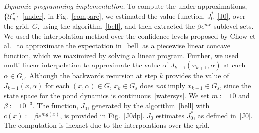 \documentclass[letterpaper, 10 pt, conference]{ieeeconf}  %
\begin{document}
\textit{Dynamic programming implementation.}
To compute the under-approximations, $\{\mathcal{U}_y^r\}$~\eqref{under}, in Fig.~\ref{compare}, we estimated the value function, $J_0^*$~\eqref{J0}, over the grid, $G$,
using the algorithm~\eqref{bell}, and then extracted the $\beta e^{m r}$-sublevel sets.
We used the interpolation method over the confidence levels proposed by Chow et al.~\cite{chow2015risk} 
to approximate the expectation in~\eqref{bell}
as a piecewise linear concave function, which we maximized by solving a linear program.\footnotemark
{}
Further, we used multi-linear interpolation to approximate the value of $J_{k+1}(x_{k+1}, \alpha)$ at each $\alpha \in G_c$.
Although the backwards recursion at step $k$ provides the value of $J_{k+1}(x, \alpha)$ for each $(x,\alpha) \in G$,
$x_k \in G_s$ does \textit{not} imply $x_{k+1} \in G_s$, since the state space for the pond dynamics is continuous~\eqref{watersys}.
We set $m := 10$ and $\beta := 10^{-3}$.
The function, $J_0$, generated by the algorithm~\eqref{bell} with $c(x) := \beta e^{m g(x)}$, is provided in Fig.~\ref{J0dp}.
$J_0$ estimates $J_0^*$, as defined in~\eqref{J0}.  
The computation is inexact due to the interpolations over the grid.
\end{document}
